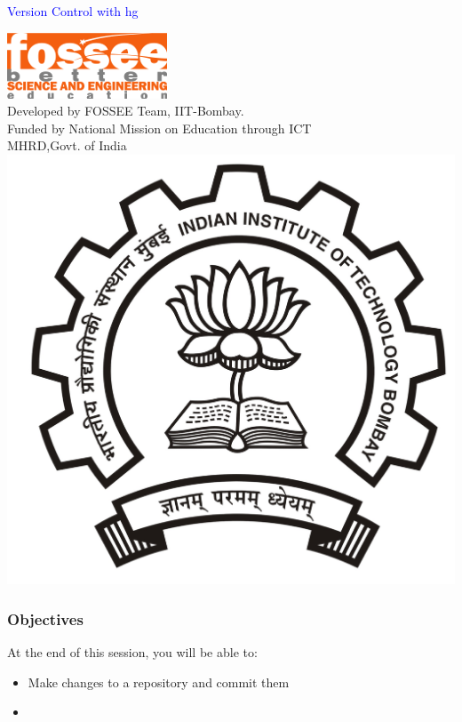 \documentclass[12pt,compress]{beamer}
\begin{document}
\begin{frame}

\begin{center}
\vspace{12pt}
\textcolor{blue}{\huge Version Control with hg}
\end{center}
\vspace{18pt}
\begin{center}
\vspace{10pt}
\includegraphics[scale=0.95]{../images/fossee-logo.png}\\
\vspace{5pt}
\scriptsize Developed by FOSSEE Team, IIT-Bombay. \\ 
\scriptsize Funded by National Mission on Education through ICT\\
\scriptsize  MHRD,Govt. of India\\
\includegraphics[scale=0.30]{../images/iitb-logo.jpg}\\
\end{center}
\end{frame}

\begin{frame}
  \frametitle{Objectives}
\label{sec-2}
  At the end of this session, you will be able to:
  \begin{itemize}
  \item Make changes to a repository and commit them
  \item 
  \end{itemize}
\end{frame}
\end{document}
